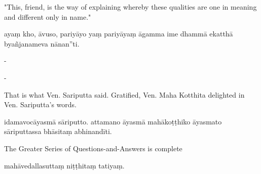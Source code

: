 \begin{samepage}
\begin{leftcolumn*}
"This, friend, is the way of explaining whereby these qualities are one in meaning and different only in name."
\end{leftcolumn*}

\begin{rightcolumn}
ayaṃ kho, āvuso, pariyāyo yaṃ pariyāyaṃ āgamma ime dhammā ekatthā byañjanameva nānan”ti.
\end{rightcolumn}
\end{samepage}

\begin{samepage}
\begin{leftcolumn*}
-
\end{leftcolumn*}

\begin{rightcolumn}
-
\end{rightcolumn}
\end{samepage}

\begin{samepage}
\begin{leftcolumn*}
That is what Ven. Sariputta said. Gratified, Ven. Maha Kotthita delighted in Ven. Sariputta's words.
\end{leftcolumn*}

\begin{rightcolumn}
idamavocāyasmā sāriputto. attamano āyasmā mahākoṭṭhiko āyasmato sāriputtassa bhāsitaṃ abhinandīti.
\end{rightcolumn}
\end{samepage}

\begin{samepage}
\begin{leftcolumn*}
The Greater Series of Questions-and-Answers is complete
\end{leftcolumn*}

\begin{rightcolumn}
mahāvedallasuttaṃ niṭṭhitaṃ tatiyaṃ.
\end{rightcolumn}
\end{samepage}

